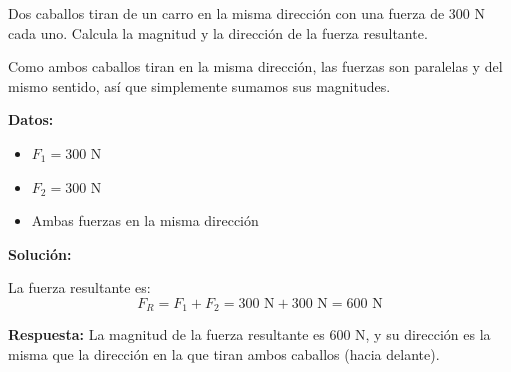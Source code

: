 \begin{exercise}
    Dos caballos tiran de un carro en la misma dirección con una fuerza de 300 N cada uno.
    Calcula la magnitud y la dirección de la fuerza resultante.


    \begin{solu}
        Como ambos caballos tiran en la misma dirección, las fuerzas son paralelas y del mismo sentido, así que simplemente sumamos sus magnitudes.

        \textbf{Datos:}
        \begin{itemize}
            \item $F_1 = 300$ N
            \item $F_2 = 300$ N
            \item Ambas fuerzas en la misma dirección
        \end{itemize}

        \textbf{Solución:}

        La fuerza resultante es:
        $$F_R = F_1 + F_2 = 300\text{ N} + 300\text{ N} = 600\text{ N}$$

        \textbf{Respuesta:} La magnitud de la fuerza resultante es 600 N, y su dirección es la misma que la dirección en la que tiran ambos caballos (hacia delante).
    \end{solu}
\end{exercise}


